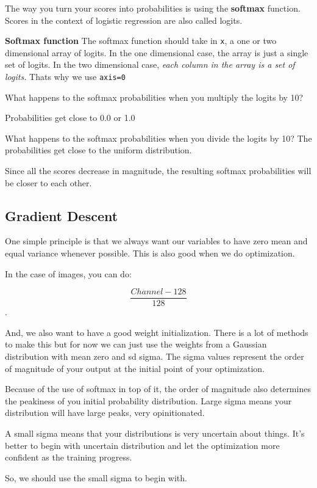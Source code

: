 \documentclass[11pt, a4paper]{article}
\begin{document}
The way you turn your scores into probabilities is using the \textbf{softmax} function. Scores in the context of logistic regression are also called logits.

\textbf{Softmax function}
The softmax function should take in \texttt{x}, a one or two dimensional array of logits. 
In the one dimensional case, the array is just a single set of logits. In the two dimensional case, \textit{each column in the array is a set of logits.} Thats why we use \texttt{axis=0}



What happens to the softmax probabilities when you multiply the logits by 10?

Probabilities get close to 0.0 or 1.0


What happens to the softmax probabilities when you divide the logits by 10?
The probabilities get close to the uniform distribution.

Since all the scores decrease in magnitude, the resulting softmax probabilities will be closer to each other. 

\subsection{Gradient Descent}%
\label{sub:gradient_descent}

One simple principle is that we always want our variables to have zero mean and equal variance whenever possible. This is also good when we do optimization. 

In the case of images, you can do:

$$ \frac{Channel - 128}{128} $$.

And, we also want to have a good weight initialization. There is a lot of methods to make this but for now we can just use the weights from a Gaussian distribution with mean zero and sd sigma.  The sigma values represent the order of magnitude of your output at the initial point of your optimization.

Because of the use of softmax in top of it, the order of magnitude also determines the peakiness of you initial probability distribution. Large sigma means your distribution will have large peaks, very opinitionated. 

A small sigma means that your distributions is very uncertain about things. It's better to begin with uncertain distribution and let the optimization more confident as the training progress. 

So, we should use the small sigma to begin with. 
\end{document}

